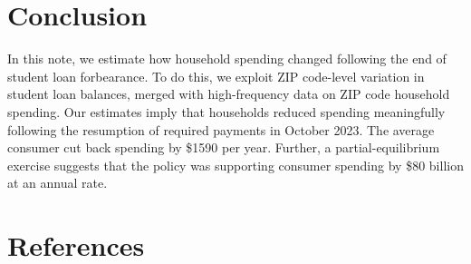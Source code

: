 \documentclass[
  letterpaper,
  DIV=11,
  numbers=noendperiod]{scrartcl}
\begin{document}
\section{Conclusion}\label{conclusion}

In this note, we estimate how household spending changed following the
end of student loan forbearance. To do this, we exploit ZIP code-level
variation in student loan balances, merged with high-frequency data on
ZIP code household spending. Our estimates imply that households reduced
spending meaningfully following the resumption of required payments in
October 2023. The average consumer cut back spending by \$1590 per year.
Further, a partial-equilibrium exercise suggests that the policy was
supporting consumer spending by \$80 billion at an annual rate.

\section*{References}\label{references}
\end{document}
